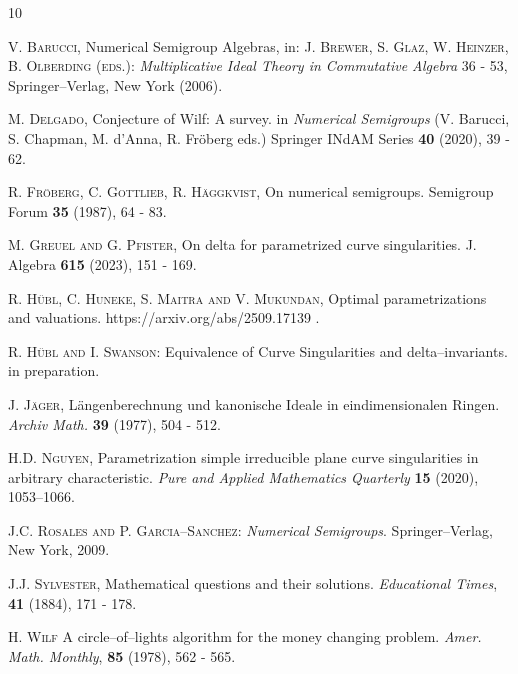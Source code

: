 \documentclass[a4paper,12pt,scrbook]{amsart}
\theoremstyle{plain}%
\theoremstyle{definition}
\begin{document}

\begin{thebibliography}{10}

 \textsc{V. Barucci}, 
Numerical Semigroup Algebras, 
in: \textsc{J. Brewer, S. Glaz, W. Heinzer, B. 
Olberding (eds.)}: \textit{Multiplicative Ideal Theory 
in Commutative Algebra} 36 - 53, Springer--Verlag, New 
York (2006). 

 \textsc{M. Delgado}, 
Conjecture of Wilf: A survey. in \textit{Numerical Semigroups} 
(V. Barucci, S. Chapman, M. d'Anna, R. Fröberg eds.) 
Springer INdAM Series \textbf{40} (2020), 39 - 62.

 \textsc{R. Fröberg, C. Gottlieb, R. Häggkvist}, 
On numerical semigroups. 
Semigroup Forum \textbf{35} (1987), 64 - 83. 

 \textsc{M. Greuel and G. Pfister}, 
On delta for parametrized curve singularities. 
J. Algebra \textbf{615} (2023), 151 - 169. 

 \textsc{R. Hübl, C. Huneke, S. Maitra and V. Mukundan}, 
Optimal parametrizations and valuations. https://arxiv.org/abs/2509.17139 . 

 \textsc{R. Hübl and I. Swanson}: 
Equivalence of Curve Singularities and 
delta--invariants. in preparation.

 \textsc{J. J\"ager}, 
L\"angenberechnung und 
kanonische Ideale in eindimensionalen Ringen. 
\textit{Archiv Math.} \textbf{39} (1977), 504 - 512.

\textsc{H.D. Nguyen},
Parametrization simple irreducible plane curve singularities in arbitrary
characteristic.
\textit{Pure and Applied Mathematics Quarterly} \textbf{15} (2020), 1053--1066.

 \textsc{J.C. Rosales and P. Garcia--Sanchez}: 
\textit{ Numerical Semigroups}. 
Springer--Verlag, New York, 2009.

 \textsc{J.J. Sylvester}, 
Mathematical questions and their solutions. 
\textit{Educational Times}, \textbf{41} (1884), 171 - 178. 

 \textsc{H. Wilf} 
A circle--of--lights algorithm for the money changing 
problem. 
\textit{Amer. Math. Monthly}, \textbf{85} (1978), 562 - 565.

\end{thebibliography}

\bigbreak

\bigbreak
\end{document}
